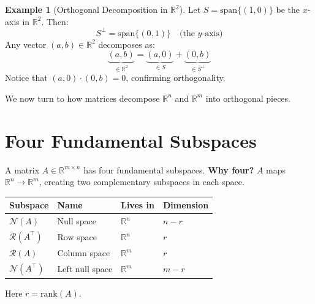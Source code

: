 \documentclass[10pt, twocolumn]{article}
\theoremstyle{definition}
\newtheorem{example}{Example}
\theoremstyle{plain}
\newcommand{\RR}{\mathbb{R}}
\newcommand{\NN}{\mathcal{N}}
\newcommand{\Range}{\mathcal{R}}
\begin{document}
\begin{example}[Orthogonal Decomposition in $\RR^2$]
Let $S = \text{span}\{(1,0)\}$ be the $x$-axis in $\RR^2$. Then:
\[
    S^\perp = \text{span}\{(0,1)\} \quad \text{(the $y$-axis)}
\]
Any vector $(a, b) \in \RR^2$ decomposes as:
\[
    \underbrace{(a, b)}_{\in \RR^2} = \underbrace{(a, 0)}_{\in S} + \underbrace{(0, b)}_{\in S^\perp}
\]
Notice that $(a,0) \cdot (0,b) = 0$, confirming orthogonality.
\end{example}

\begin{center}
\end{center}

We now turn to how matrices decompose $\RR^n$ and $\RR^m$ into orthogonal pieces.

\section{Four Fundamental Subspaces}

A matrix $A \in \RR^{m \times n}$ has four fundamental subspaces. \textbf{Why four?} $A$ maps $\RR^n \to \RR^m$, creating two complementary subspaces in each space.

\begin{center}
\begin{tabular}{@{}llll@{}}
\toprule
\textbf{Subspace} & \textbf{Name} & \textbf{Lives in} & \textbf{Dimension} \\
\midrule
$\NN(A)$ & Null space & $\RR^n$ & $n - r$ \\
$\Range(A^\top)$ & Row space & $\RR^n$ & $r$ \\
$\Range(A)$ & Column space & $\RR^m$ & $r$ \\
$\NN(A^\top)$ & Left null space & $\RR^m$ & $m - r$ \\
\bottomrule
\end{tabular}
\end{center}
Here $r = \text{rank}(A)$.
\end{document}
